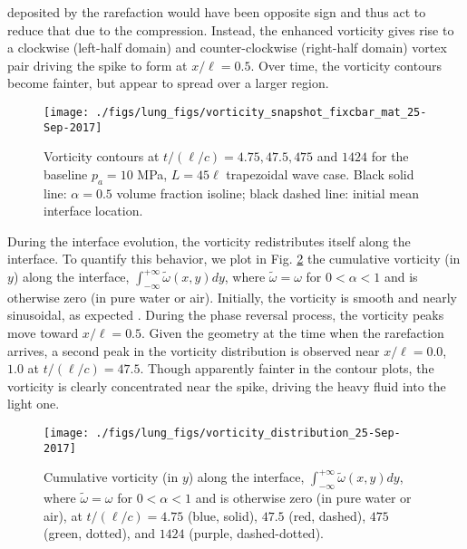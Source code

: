 \documentclass{jfm}%
\begin{document}
deposited by the rarefaction would have been opposite sign and thus
act to reduce that due to the compression.  Instead, the enhanced
vorticity gives rise to a clockwise (left-half domain) and
counter-clockwise (right-half domain) vortex pair driving the spike to
form at $x/\ell=0.5$. Over time, the vorticity contours become fainter,
but appear to spread over a larger region.
\begin{figure}
  \centering
  \texttt{[image: ./figs/lung\_figs/vorticity\_snapshot\_fixcbar\_mat\_25-Sep-2017]}
  \caption[The evolution of the vorticity] {Vorticity contours at $t/(\ell/c) =
    4.75, 47.5, 475$ and $1424$ for the baseline $p_a = 10$ MPa, $L=45
    \ell$ trapezoidal wave case. Black solid line: $\alpha=0.5$ volume
    fraction isoline; black dashed line: initial mean interface location.}
  \label{fig:vorticity_snapshots}
\end{figure}

During the interface evolution, the vorticity redistributes itself
along the interface. To quantify this behavior, we plot in Fig.
\ref{fig:vorticity_distribution} the cumulative vorticity (in $y$)
along the interface, $ \int_{-\infty}^{+\infty} \tilde{\omega}(x,y) dy
$, where $\tilde{\omega} = \omega$ for $0 < \alpha < 1$ and is
otherwise zero (in pure water or air). Initially, the vorticity is smooth and nearly
sinusoidal, as expected \citep{Samtaney1994}.  During the
phase reversal process, the vorticity peaks move toward
$x/\ell=0.5$. Given the geometry at the time when the rarefaction
arrives, a second peak in the vorticity distribution is observed near
$x/\ell=0.0$, $1.0$ at $t/(\ell/c)=47.5$. Though apparently fainter in the
contour plots, the vorticity is clearly concentrated near the spike,
driving the heavy fluid into the light one.

\begin{figure}
  \centering
  \texttt{[image: ./figs/lung\_figs/vorticity\_distribution\_25-Sep-2017]}
  \caption{Cumulative vorticity (in $y$) along the interface,
    $ \int_{-\infty}^{+\infty} \tilde{\omega}(x,y) dy $, where
    $\tilde{\omega} = \omega$ for $0 < \alpha < 1$ and is otherwise
    zero (in pure water or air), at $t/(\ell/c)=4.75$ (blue, solid), $47.5$
    (red, dashed), $475$ (green, dotted), and $1424$ (purple,
    dashed-dotted).}
  \label{fig:vorticity_distribution}
\end{figure}
\end{document}
